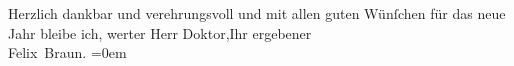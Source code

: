 \pstart
           Herzlich dankbar und verehrungsvoll {\pb}und mit
               allen guten Wünſchen für das neue Jahr bleibe ich, werter Herr Doktor,\hspace*{1.5em}Ihr ergebener{\\[\baselineskip]}\spacefill\mbox{Felix Braun.}\pend
           \leftskip=0em{}\endnumbering{}  \newcommand{\dateiname}{L02425}\newcommand{\titel}{Felix Braun an Arthur Schnitzler, 26. 12. 1924}\newcommand{\editorInnen}{Martin Anton Müller und Gerd-Hermann Susen}
